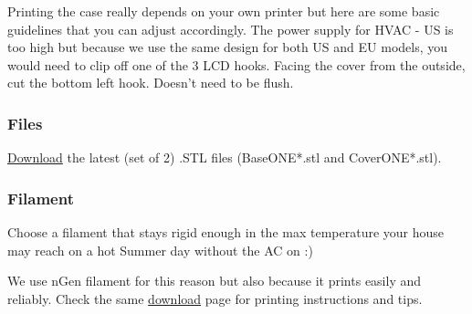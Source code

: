 Printing the case really depends on your own printer but here are some basic
guidelines that you can adjust accordingly. The power supply for HVAC - US is
too high but because we use the same design for both US and EU models, you
would need to clip off one of the 3 LCD hooks. Facing the cover from the
outside, cut the bottom left hook. Doesn't need to be flush.

\subsubsection{Files}
\href{https://hestiapi.com/downloads/}{Download} the latest (set of 2) .STL
files (BaseONE*.stl and CoverONE*.stl).

\subsubsection{Filament}
Choose a filament that stays rigid enough in the max temperature your house may
reach on a hot Summer day without the AC on :)

We use nGen filament for this reason but also because it prints easily and
reliably.  Check the same \href{https://hestiapi.com/downloads/}{download} page
for printing instructions and tips.
